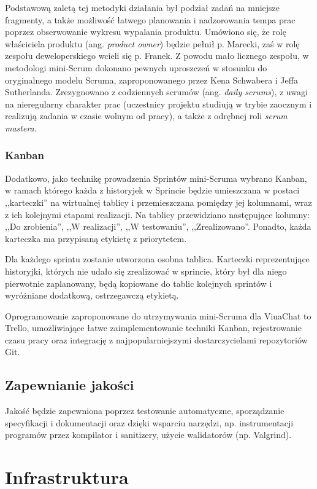\documentclass[11pt,oneside,a4paper,titlepage,onecolumn]{article}
\begin{document}
Podstawową zaletą tej metodyki działania był podział zadań na mniejsze fragmenty, a także możliwość łatwego 
planowania i nadzorowania tempa prac poprzez obserwowanie wykresu wypalania produktu. Umówiono się, że rolę 
właściciela produktu (ang. \textit{product owner}) będzie pełnił p. Marecki, zaś w rolę zespołu deweloperskiego 
wcieli się p. Franek. Z powodu mało licznego zespołu, w metodologi mini-Scrum dokonano pewnych uproszczeń w 
stosunku do oryginalnego modelu Scruma, zaproponowanego przez Kena Schwabera i Jeffa Sutherlanda. Zrezygnowano 
z codziennych scrumów (ang. \textit{daily scrums}), z uwagi na nieregularny charakter prac (uczestnicy projektu
studiują w trybie zaocznym i realizują zadania w czasie wolnym od pracy), a także z odrębnej roli \textit{scrum 
mastera}.

\subsubsection{Kanban}
Dodatkowo, jako technikę prowadzenia Sprintów mini-Scruma wybrano Kanban, w ramach którego każda z historyjek 
w Sprincie będzie umieszczana w postaci ,,karteczki'' na wirtualnej tablicy i przemieszczana pomiędzy jej kolumnami, 
wraz z ich kolejnymi etapami realizacji. Na tablicy przewidziano następujące kolumny: ,,Do zrobienia'', ,,W 
realizacji'', ,,W testowaniu'', ,,Zrealizowano''. Ponadto, każda karteczka ma przypisaną etykietę z priorytetem. 

Dla każdego sprintu zostanie utworzona osobna tablica. Karteczki reprezentujące historyjki, których nie udało się 
zrealizować w sprincie, który był dla niego pierwotnie zaplanowany, będą kopiowane do tablic kolejnych sprintów 
i wyróżniane dodatkową, ostrzegawczą etykietą.

Oprogramowanie zaproponowane do utrzymywania mini-Scruma dla ViuaChat to Trello, umożliwiające łatwe
zaimplementowanie techniki Kanban, rejestrowanie czasu pracy oraz integrację z najpopularniejszymi
dostarczycielami repozytoriów Git.

\subsection{Zapewnianie jakości}

Jakość  będzie zapewniona poprzez testowanie automatyczne, sporządzanie specyfikacji i dokumentacji 
oraz dzięki wsparciu narzędzi, np. instrumentacji programów przez kompilator i sanitizery, użycie walidatorów (np.
Valgrind).

\section{Infrastruktura}
\end{document}

